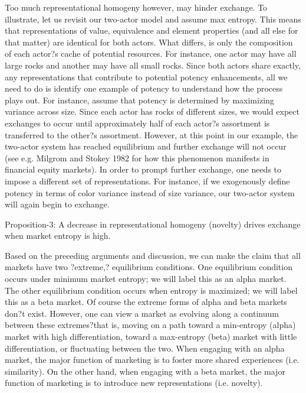 Too much representational homogeny however, may hinder exchange. To illustrate, let us revisit our two-actor model and assume max entropy. This means that representations of value, equivalence and element properties (and all else for that matter) are identical for both actors. What differs, is only the composition of each actor?s cache of potential resources. For instance, one actor may have all large rocks and another may have all small rocks. Since both actors share exactly, any representations that contribute to potential potency enhancements, all we need to do is identify one example of potency to understand how the process plays out. For instance, assume that potency is determined by maximizing variance across size. Since each actor has rocks of different sizes, we would expect exchanges to occur until approximately half of each actor?s assortment is transferred to the other?s assortment. However, at this point in our example, the two-actor system has reached equilibrium and further exchange will not occur (see e.g. Milgrom and Stokey 1982 for how this phenomenon manifests in financial equity markets). In order to prompt further exchange, one needs to impose a different set of representations. For instance, if we exogenously define potency in terms of color variance instead of size variance, our two-actor system will again begin to exchange.
 
Proposition-3: A decrease in representational homogeny (novelty) drives exchange when market entropy is high.
 
Based on the preceding arguments and discussion, we can make the claim that all markets have two ?extreme,? equilibrium conditions. One equilibrium condition occurs under minimum market entropy; we will label this as an alpha market. The other equilibrium condition occurs when entropy is maximized; we will label this as a beta market. Of course the extreme forms of alpha and beta markets don?t exist. However, one can view a market as evolving along a continuum between these extremes?that is, moving on a path toward a min-entropy (alpha) market with high differentiation, toward a max-entropy (beta) market with little differentiation, or fluctuating between the two. When engaging with an alpha market, the major function of marketing is to foster more shared experiences (i.e. similarity). On the other hand, when engaging with a beta market, the major function of marketing is to introduce new representations (i.e. novelty). 
 
